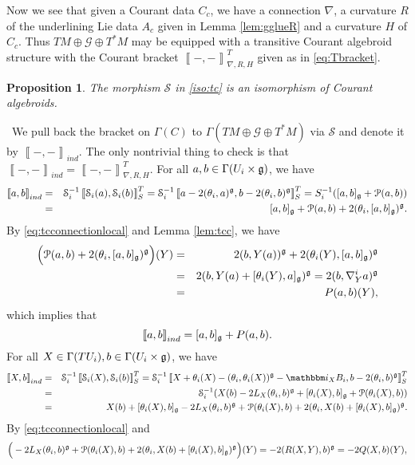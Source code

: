 \documentclass[letterpaper,10pt, oneside]{article} %
\newtheorem{pro}[thm]{Proposition}
\newcommand{\pf}{\noindent{\bf Proof.}\ }
\newcommand{\ii}{\mathbbm i}
\newcommand{\huaS}{\mathcal{S}}
\newcommand{\huaG}{\mathcal{G}}
\newcommand{\huaP}{\mathcal{P}}
\newcommand{\Courant}[1]{\left\llbracket  #1\right\rrbracket }
\begin{document}
Now we see that given a Courant data $C_c$, we have a connection $\nabla$, a curvature $R$ of the underlining Lie data $A_c$ given in Lemma \ref{lem:gglueR} and a curvature $H$ of $C_c$. Thus $TM\oplus \huaG\oplus T^*M$ may be equipped with a transitive Courant algebroid structure with the Courant bracket $\Courant{-,-}^T_{\nabla, R, H}$ given as in \eqref{eq:Tbracket}.

\begin{pro}\label{GlobalCA}
The morphism $\huaS$ in \eqref{iso:tc} is an isomorphism of Courant algebroids.
 \end{pro}
 \pf We pull back the bracket on $\Gamma(C)$ to $\Gamma (TM\oplus \huaG\oplus T^*M)$ via $\huaS$ and denote it by $\Courant{-,-}_{ind}$. The only nontrivial thing to check is that $\Courant{-,-}_{ind}=\Courant{-,-}^T_{\nabla, R, H}$.  For all $a,b\in\Gamma(U_i\times \mathfrak g)$, we have
\begin{eqnarray*}
  \Courant{a,b}_{ind}&=&\huaS_i^{-1}\Courant{\huaS_i(a),\huaS_i(b)}^T_S=\huaS_i^{-1}\Courant{a-2(\theta_i,a)^\g,b-2(\theta_i,b)^\g}^T_S=S_i^{-1}([a,b]_\g+\huaP(a,b))\\
  &=&[a,b]_\g+\huaP(a,b)+2(\theta_i,[a,b]_\g)^\g.
\end{eqnarray*}
By \eqref{eq:tcconnectionlocal} and Lemma \ref{lem:tcc}, we have
\begin{eqnarray*}
  \Big(\huaP(a,b)+2(\theta_i,[a,b]_\g)^\g\Big)(Y)&=&2(b,Y(a))^\g+2(\theta_i(Y),[a,b]_\g)^\g\\
  &=&2(b,Y(a)+[\theta_i(Y),a]_\g)^\g=2(b,\nabla^i_Ya)^\g\\
  &=&P(a,b)(Y),
\end{eqnarray*}
which implies that
\begin{equation}
  \label{eq:gbr1}\Courant{a,b}_{ind}=[a,b]_\g+P(a,b).
\end{equation}
For all $X\in\Gamma(TU_i), b\in\Gamma(U_i\times \mathfrak g)$, we have
\begin{eqnarray*}
  \Courant{X,b}_{ind}&=&\huaS_i^{-1}\Courant{\huaS_i(X),\huaS_i(b)}^T_S=\huaS_i^{-1}\Courant{X+\theta_i(X)-(\theta_i,\theta_i(X))^\g-\ii_XB_i,b-2(\theta_i,b)^\g}^T_S\\
  &=&\huaS_i^{-1}(X(b)-2L_X(\theta_i,b)^\g+[\theta_i(X),b]_\g+\huaP(\theta_i(X),b))\\
  &=&X(b)+[\theta_i(X),b]_\g-2L_X(\theta_i,b)^\g+\huaP(\theta_i(X),b)+2(\theta_i,X(b)+[\theta_i(X),b]_\g)^\g.
\end{eqnarray*}
By \eqref{eq:tcconnectionlocal}
and
\begin{eqnarray*}
 \Big(-2L_X(\theta_i,b)^\g+\huaP(\theta_i(X),b)+2(\theta_i,X(b)+[\theta_i(X),b]_\g)^\g\Big)(Y)=-2(R(X,Y),b)^\g=-2Q(X,b)(Y),
\end{eqnarray*}
\end{document}
